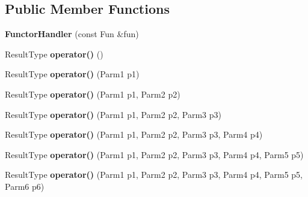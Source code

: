 \subsection*{Public Member Functions}
\begin{DoxyCompactItemize}
\item 
\hypertarget{classLoki_1_1FunctorHandler_a140f7eea1f3cf130f3c6d7aed3932223}{}{\bfseries Functor\+Handler} (const Fun \&fun)\label{classLoki_1_1FunctorHandler_a140f7eea1f3cf130f3c6d7aed3932223}

\item 
\hypertarget{classLoki_1_1FunctorHandler_a4573811a249ab8c4384556a754bfb925}{}Result\+Type {\bfseries operator()} ()\label{classLoki_1_1FunctorHandler_a4573811a249ab8c4384556a754bfb925}

\item 
\hypertarget{classLoki_1_1FunctorHandler_a0bfa0a846cf9567ffa973ffa049508b5}{}Result\+Type {\bfseries operator()} (Parm1 p1)\label{classLoki_1_1FunctorHandler_a0bfa0a846cf9567ffa973ffa049508b5}

\item 
\hypertarget{classLoki_1_1FunctorHandler_ad8e391daa09dfd3b801fe7f7e0919887}{}Result\+Type {\bfseries operator()} (Parm1 p1, Parm2 p2)\label{classLoki_1_1FunctorHandler_ad8e391daa09dfd3b801fe7f7e0919887}

\item 
\hypertarget{classLoki_1_1FunctorHandler_aebb9ccf4f5a4e8fb0fc1db886912360a}{}Result\+Type {\bfseries operator()} (Parm1 p1, Parm2 p2, Parm3 p3)\label{classLoki_1_1FunctorHandler_aebb9ccf4f5a4e8fb0fc1db886912360a}

\item 
\hypertarget{classLoki_1_1FunctorHandler_aa8ada0dbd06ffae68591ce7398c203bb}{}Result\+Type {\bfseries operator()} (Parm1 p1, Parm2 p2, Parm3 p3, Parm4 p4)\label{classLoki_1_1FunctorHandler_aa8ada0dbd06ffae68591ce7398c203bb}

\item 
\hypertarget{classLoki_1_1FunctorHandler_aee2e5aae7fe6f0f9db984200c6a33334}{}Result\+Type {\bfseries operator()} (Parm1 p1, Parm2 p2, Parm3 p3, Parm4 p4, Parm5 p5)\label{classLoki_1_1FunctorHandler_aee2e5aae7fe6f0f9db984200c6a33334}

\item 
\hypertarget{classLoki_1_1FunctorHandler_aec273c084df1dbe2f4bd2e2ed9f641a7}{}Result\+Type {\bfseries operator()} (Parm1 p1, Parm2 p2, Parm3 p3, Parm4 p4, Parm5 p5, Parm6 p6)\label{classLoki_1_1FunctorHandler_aec273c084df1dbe2f4bd2e2ed9f641a7}


\end{DoxyCompactItemize}
